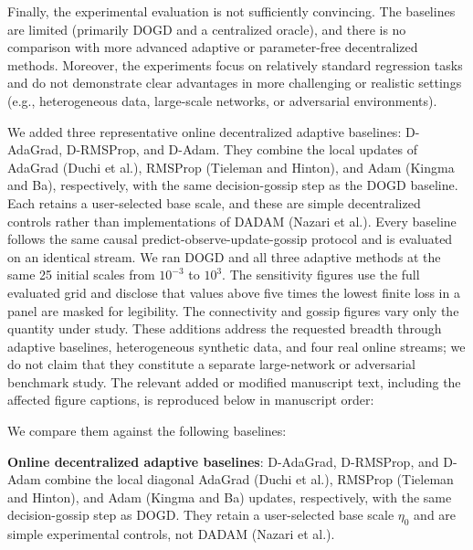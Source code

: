 \documentclass[12pt,english]{reviewresponse}
\begin{document}
\begin{revcomment}
    Finally, the experimental evaluation is not sufficiently convincing. The baselines are limited (primarily DOGD and a centralized oracle), and there is no comparison with more advanced adaptive or parameter-free decentralized methods. Moreover, the experiments focus on relatively standard regression tasks and do not demonstrate clear advantages in more challenging or realistic settings (e.g., heterogeneous data, large-scale networks, or adversarial environments).
\end{revcomment}
\begin{revresponse}
    We added three representative online decentralized adaptive baselines: D-AdaGrad, D-RMSProp, and D-Adam.  They combine the local updates of AdaGrad (Duchi et al.), RMSProp (Tieleman and Hinton), and Adam (Kingma and Ba), respectively, with the same decision-gossip step as the DOGD baseline.  Each retains a user-selected base scale, and these are simple decentralized controls rather than implementations of DADAM (Nazari et al.).
    Every baseline follows the same causal predict-observe-update-gossip protocol and is evaluated on an identical stream. We ran DOGD and all three adaptive methods at the same 25 initial scales from $10^{-3}$ to $10^3$. The sensitivity figures use the full evaluated grid and disclose that values above five times the lowest finite loss in a panel are masked for legibility. The connectivity and gossip figures vary only the quantity under study.
    These additions address the requested breadth through adaptive baselines, heterogeneous synthetic data, and four real online streams; we do not claim that they constitute a separate large-network or adversarial benchmark study.
    The relevant added or modified manuscript text, including the affected figure captions, is reproduced below in manuscript order:
    \begin{changes}
        We compare them against the following baselines:

        \textbf{Online decentralized adaptive baselines}: D-AdaGrad, D-RMSProp, and D-Adam combine the local diagonal AdaGrad (Duchi et al.), RMSProp (Tieleman and Hinton), and Adam (Kingma and Ba) updates, respectively, with the same decision-gossip step as DOGD\@. They retain a user-selected base scale $\eta_0$ and are simple experimental controls, not DADAM (Nazari et al.).


\end{changes}
\end{revresponse}
\end{document}

